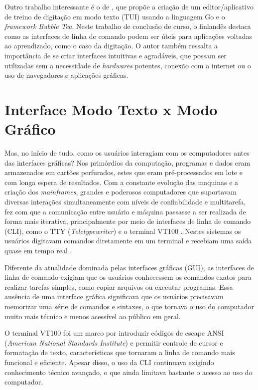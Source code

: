 Outro trabalho interessante é o de \cite{Lindroos2025}, que propõe a criação de um editor/aplicativo de
treino de digitação em modo texto (TUI) usando a linguagem Go e o \textit{framework Bubble Tea}. Neste
trabalho de conclusão de curso, o finlandês destaca como as interfaces de linha de comando podem ser úteis
para aplicações voltadas ao aprendizado, como o caso da digitação. O autor também ressalta a importância
de se criar interfaces intuitivas e agradáveis, que possam ser utilizadas sem a necessidade de \textit{hardwares}
potentes, conexão com a internet ou o uso de navegadores e aplicações gráficas.

\section{Interface Modo Texto x Modo Gráfico}

Mas, no início de tudo, como os usuários interagiam com os computadores antes das interfaces gráficas?
Nos primórdios da computação, programas e dados eram armazenados em cartões perfurados,
estes que eram pré-processados em lote e com longa espera de resultados. Com a constante
evolução das maquinas e a criação dos \textit{mainframes}, grandes e poderosos
computadores que suportavam diversas interações simultaneamente com níveis de
confiabilidade e multitarefa, fez com que a comunicação entre usuário e máquina passasse
a ser realizada de forma mais iterativa, principalmente por meio de interfaces
de linha de comando (CLI), como o TTY (\textit{Teletypewriter}) \cite{ColumbiaTeletype2023}
e o terminal VT100 \cite{DEC_VT100}. Nestes sistemas os usuários digitavam
comandos diretamente em um terminal e recebiam uma saída quase em tempo real
\cite{ComputerHistoryMuseum}.

Diferente da atualidade dominada pelas interfaces gráficas (GUI), as interfaces de
linha de comando exigiam que os usuários conhecessem os comandos exatos para realizar
tarefas simples, como copiar arquivos ou executar programas. Essa ausência de uma
interface gráfica significava que os usuários precisavam memorizar uma série de comandos
e sintaxes, o que tornava o uso do computador muito mais técnico e menos
acessível ao público em geral.

O terminal VT100 foi um marco por introduzir códigos de escape ANSI (\textit{American National
Standards Institute}) e permitir controle de cursor e formatação de texto, características
que tornaram a linha de comando mais funcional e eficiente. Apesar disso, o uso da
CLI continuava exigindo conhecimento técnico avançado, o que ainda limitava
bastante o acesso ao uso do computador.

